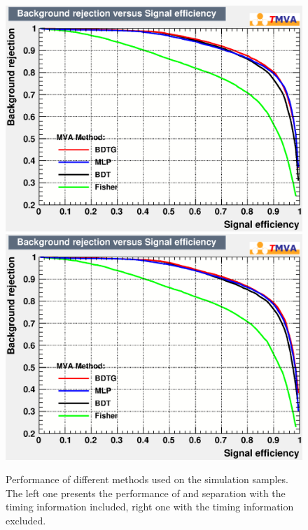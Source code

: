 \begin{figure}[!htb]
  \begin{center}
    \includegraphics[width=0.49\linewidth]{Figures/06_ECAL/fast_sim/Identification/gamma_piz/with_time/rejBvsS.eps} 
    \includegraphics[width=0.49\linewidth]{Figures/06_ECAL/fast_sim/Identification/gamma_piz/no_time/rejBvsS.eps}
    \vspace*{-0.5cm}
  \end{center}
  \caption{
   Performance of different methods used on the simulation samples.
   The left one presents the performance of \g and \piz separation with the timing information included, 
   right one with the timing information excluded.
  }
  \label{fig:identi_gamma_piz_ROC}
\end{figure}

